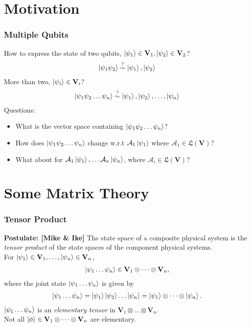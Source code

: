 \documentclass{beamer}
\theoremstyle{definition}
\newcommand{\V}{\mathbf{V}}
\newcommand{\A}{\mathcal{A}}
\begin{document}
\section{Motivation}

\begin{frame}
\frametitle{Multiple Qubits}
How to express the state of two qubits, $\ket{\psi_1}\in \V_1, \ket{\psi_2}\in \V_2$?
\begin{align*}
\left\vert{\psi_1\psi_2}\right\rangle \stackrel{?}{\sim} \left\vert{\psi_1}\right\rangle, \left\vert{\psi_2}\right\rangle
\end{align*}
More than two, $\ket{\psi_i} \in \V_i$?
\begin{align*}
\left\vert{\psi_1\psi_2\dots\psi_n}\right\rangle \stackrel{?}{\sim} \left\vert{\psi_1}\right\rangle,\left\vert{\psi_2}\right\rangle,\dots,\left\vert{\psi_n}\right\rangle
\end{align*}
Questions:
\begin{itemize}
	\item What is the vector space containing $\left\vert{\psi_1\psi_2\dots\psi_n}\right\rangle$?
	\item How does $\left\vert{\psi_1\psi_2\dots\psi_n}\right\rangle$ change w.r.t $\A_1\ket{\psi_1}$ where $\A_1 \in \mathfrak{L}(\V)$?
	\item What about for $\A_1\ket{\psi_1},\dots\A_n\ket{\psi_n}$, where $\A_i \in \mathfrak{L}(\V)$?
\end{itemize}
\end{frame}


















\section{Some Matrix Theory}


\begin{frame}
\frametitle{Tensor Product}
\textbf{Postulate: [Mike \& Ike]} The state space of a composite physical system is the \textit{tensor product} of the state spaces of the component physical systems. \\
$\,$\\
For $\ket{\psi_1}\in \V_1, \dots, \ket{\psi_n}\in \V_n$, 
\begin{align*}
\ket{\psi_1\dots\psi_n} \in \V_1\otimes \dots \otimes \V_n,
\end{align*}
where the joint state $\left\vert{\psi_1\dots\psi_n}\right\rangle$ is given by
\begin{align*}
\left\vert{\psi_1\dots\psi_n}\right\rangle = \left\vert{\psi_1}\right\rangle\left\vert{\psi_2}\right\rangle\dots\left\vert{\psi_n}\right\rangle = \left\vert{\psi_1}\right\rangle\otimes \dots \otimes \left\vert{\psi_n}\right\rangle.
\end{align*}
$\left\vert{\psi_1\dots\psi_n}\right\rangle$ is an \textit{elementary tensor} in $\V_1\otimes \dots \otimes \V_n$. \\
$\,$\\
Not all $\ket{\phi} \in \V_1\otimes \dots \otimes \V_n$ are elementary.




\end{frame}
\end{document}
